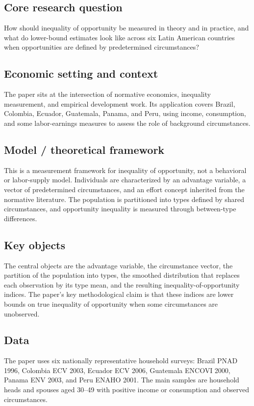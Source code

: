 \documentclass[11pt,a4paper]{article}
\begin{document}
\subsection*{Core research question}
How should inequality of opportunity be measured in theory and in practice, and what do lower-bound estimates look like across six Latin American countries when opportunities are defined by predetermined circumstances?

\subsection*{Economic setting and context}
The paper sits at the intersection of normative economics, inequality measurement, and empirical development work. Its application covers Brazil, Colombia, Ecuador, Guatemala, Panama, and Peru, using income, consumption, and some labor-earnings measures to assess the role of background circumstances.

\subsection*{Model / theoretical framework}
This is a measurement framework for inequality of opportunity, not a behavioral or labor-supply model. Individuals are characterized by an advantage variable, a vector of predetermined circumstances, and an effort concept inherited from the normative literature. The population is partitioned into types defined by shared circumstances, and opportunity inequality is measured through between-type differences.

\subsection*{Key objects}
The central objects are the advantage variable, the circumstance vector, the partition of the population into types, the smoothed distribution that replaces each observation by its type mean, and the resulting inequality-of-opportunity indices. The paper’s key methodological claim is that these indices are lower bounds on true inequality of opportunity when some circumstances are unobserved.

\subsection*{Data}
The paper uses six nationally representative household surveys: Brazil PNAD 1996, Colombia ECV 2003, Ecuador ECV 2006, Guatemala ENCOVI 2000, Panama ENV 2003, and Peru ENAHO 2001. The main samples are household heads and spouses aged 30–49 with positive income or consumption and observed circumstances.
\end{document}
